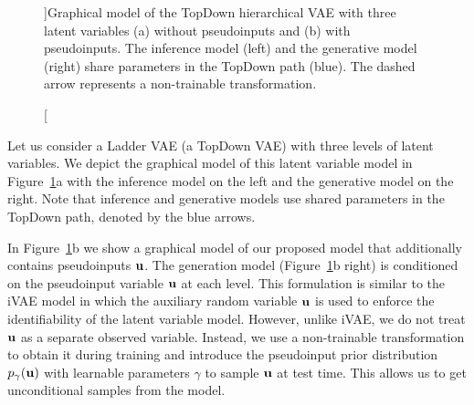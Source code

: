 \begin{figure}[t]
{}
    \caption[][\baselineskip]{Graphical model of the TopDown hierarchical VAE with three latent variables (a) without pseudoinputs and (b) with pseudoinputs. The inference model (left) and the generative model (right) share parameters in the TopDown path (blue). The dashed arrow represents a non-trainable transformation.}
    \label{fig:dct_vae_graph_model}
\vskip 10pt
\end{figure}

Let us consider a Ladder VAE (a TopDown VAE) with three levels of latent variables. We depict the graphical model of this latent variable model in Figure~\ref{fig:dct_vae_graph_model}a with the inference model on the left and the generative model on the right. Note that inference and generative models use shared parameters in the TopDown path, denoted by the blue arrows. 

In Figure~\ref{fig:dct_vae_graph_model}b we show a graphical model of our proposed model that additionally contains pseudoinputs ${\mathbf{u}}$.
The generation model (Figure~\ref{fig:dct_vae_graph_model}b right) is conditioned on the pseudoinput variable ${\mathbf{u}}$ at each level. 
This formulation is similar to the iVAE model \citep{khemakhem2020variational} in which the auxiliary random variable ${\mathbf{u}} $ is used to enforce the identifiability of the latent variable model. 
However, unlike iVAE, we do not treat ${\mathbf{u}}$ as a separate observed variable. Instead, we use a non-trainable transformation to obtain it during training and introduce the pseudoinput prior distribution $p_{\gamma}({\mathbf{u}})$ with learnable parameters $\gamma$ to sample ${\mathbf{u}}$ at test time. 
This allows us to get unconditional samples from the model.

